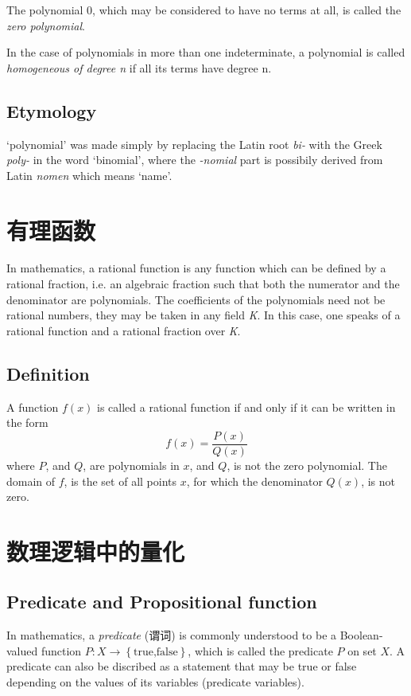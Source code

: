 \documentclass{book}
\newcommand{\set}[1]{\left\{#1\right\}}
\numberwithin{equation}{section}
\numberwithin{figure}{section}
\theoremstyle{definition}
\newcommand{\sq}[1]{`#1'}
\begin{document}
The polynomial 0, which may be considered to have no terms at all, is called the \emph{zero polynomial}.

In the case of polynomials in more than one indeterminate, a polynomial is called \emph{homogeneous of degree n} if all its terms have degree n.

\subsection{Etymology}
\sq{polynomial} was made simply by replacing the Latin root \emph{bi-} with the Greek \emph{poly-} in the word \sq{binomial}, where the \emph{-nomial} part is possibily derived from Latin \emph{nomen} which means \sq{name}.

\section{有理函数}
In mathematics, a rational function is any function which can be defined by a rational fraction, i.e. an algebraic fraction such that both the numerator and the denominator are polynomials. The coefficients of the polynomials need not be rational numbers, they may be taken in any field \emph{K}. In this case, one speaks of a rational function and a rational fraction over \emph{K}.

\subsection{Definition}
A function $f(x)$ is called a rational function if and only if it can be written in the form
\begin{equation*}
  f(x) = \frac{P(x)}{Q(x)} 
\end{equation*}
 where $P$, and $Q$, are polynomials in $x$, and $Q$, is not the zero polynomial. The domain of $f$, is the set of all points $x$, for which the denominator $Q(x)$, is not zero.

\section{数理逻辑中的量化}
\label{sec:logicalquantification}
\subsection{Predicate and Propositional function}
In mathematics, a \emph{predicate} (谓词) is commonly understood to be a Boolean-valued function $P:X\to\set{\text{true,false}}$, which is called the predicate $P$ on set $X$. A predicate can also be discribed as a statement that may be true or false depending on the values of its variables (predicate variables).
\end{document}
